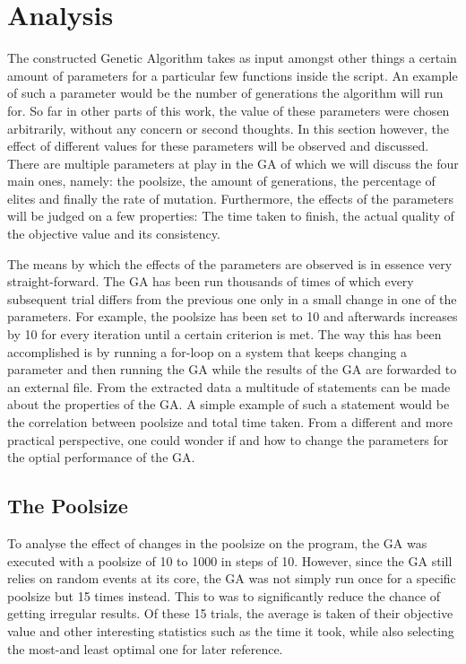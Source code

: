 \section{Analysis} \label{Analysis}

\par
The constructed Genetic Algorithm takes as input amongst other things a certain amount of parameters for a particular few functions inside the script. An example of such a parameter would be the number of generations the algorithm will run for. So far in other parts of this work, the value of these parameters were chosen arbitrarily, without any concern or second thoughts. In this section however, the effect of different values for these parameters will be observed and discussed. 
There are multiple parameters at play in the GA of which we will discuss the four main ones, namely: the poolsize, the amount of generations, the percentage of elites and finally the rate of mutation. Furthermore, the effects of the parameters will be judged on a few properties: The time taken to finish, the actual quality of the objective value and its consistency.
\par
The means by which the effects of the parameters are observed is in essence very straight-forward. The GA has been run thousands of times of which every subsequent trial differs from the previous one only in a small change in one of the parameters.
For example, the poolsize has been set to 10 and afterwards increases by 10 for every iteration until a certain criterion is met. The way this has been accomplished is by running a for-loop on a system that keeps changing a parameter and then running the GA while the results of the GA are forwarded to an external file.
From the extracted data a multitude of statements can be made about the properties of the GA. A simple example of such a statement would be the correlation between poolsize and total time taken. From a different and more practical perspective, one could wonder if and how to change the parameters for the optial performance of the GA.

\subsection{The Poolsize}

\par
To analyse the effect of changes in the poolsize on the program, the GA was executed with a poolsize of 10 to 1000 in steps of 10. However, since the GA still relies on random events at its core, the GA was not simply run once for a specific poolsize but 15 times instead. This to was to significantly reduce the chance of getting irregular results. Of these 15 trials, the average is taken of their objective value and other interesting statistics such as the time it took, while also selecting the most-and least optimal one for later reference.


